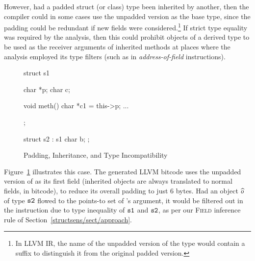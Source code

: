 However, had a padded struct (or class) type been inherited by
another, then the compiler could in some cases use the unpadded
version as the base type, since the padding could be redundant if new
fields were considered.\footnote{In LLVM IR, the name of the unpadded
  version of the type would contain a  suffix to
  distinguish it from the original padded version.} If strict type
equality was required by the analysis, then this could prohibit
objects of a derived type to be used as the receiver arguments of
inherited methods at places where the analysis employed its type
filters (such as in \emph{address-of-field} instructions).

\begin{figure}[h!t]
  \begin{minipage}[b]{.3\linewidth}
    \begin{lcppcode}
      struct s1 {
        char *p;
        char c;

        void meth() {
          char *c1 = this->p;
          ...
        }
      };

      struct s2 : s1 {
        char b;
      };
    \end{lcppcode}
    \label{structsens/fig/typeincompat:cxx}
  \end{minipage}%
  \qquad
  \begin{minipage}[b]{.6\linewidth}
    \centering\large
    \label{structsens/fig/typeincompat:bitcode}
  \end{minipage}
  \caption{Padding, Inheritance, and Type Incompatibility}
  \label{structsens/fig/typeincompat}
\end{figure}

Figure~\ref{structsens/fig/typeincompat} illustrates this case. The
generated LLVM bitcode uses the unpadded version of  as its
first field (inherited objects are always translated to normal fields,
in bitcode), to reduce its overall padding to just 6 bytes. Had an
object \(\widehat{o}\) of type \(\texttt{s2}\) flowed to the points-to set
of 's  argument, it would be filtered out
in the  instruction due to type inequality of
\(\texttt{s1}\) and \(\texttt{s2}\), as per our \textsc{Field} inference rule
of Section~\ref{structsens/sect/approach}.

